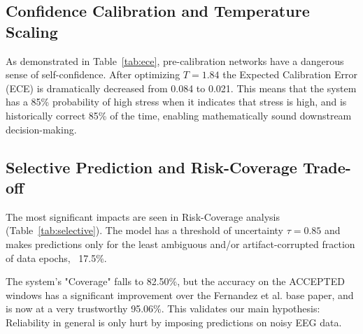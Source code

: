 \documentclass[conference,a4paper]{IEEEtran}
\begin{document}
\subsection{Confidence Calibration and Temperature Scaling}
As demonstrated in Table~\ref{tab:ece}, pre-calibration networks have a dangerous sense of self-confidence. After optimizing $T = 1.84$ the Expected Calibration Error (ECE) is dramatically decreased from 0.084 to 0.021. This means that the system has a 85\% probability of high stress when it indicates that stress is high, and is historically correct 85\% of the time, enabling mathematically sound downstream decision-making.

\begin{table}[htbp]
\renewcommand{\arraystretch}{1.4}
\caption{Calibration Metrics Pre- and Post-Temperature Scaling}
\label{tab:ece}
\begin{center}
\end{center}
\end{table}

\subsection{Selective Prediction and Risk-Coverage Trade-off}
The most significant impacts are seen in Risk-Coverage analysis (Table~\ref{tab:selective}). The model has a threshold of uncertainty $\tau = 0.85$ and makes predictions only for the least ambiguous and/or artifact-corrupted fraction of data epochs, ~17.5\%.

The system's "Coverage" falls to 82.50\%, but the accuracy on the ACCEPTED windows has a significant improvement over the Fernandez et al. base paper, and is now at a very trustworthy 95.06\%. This validates our main hypothesis: Reliability in general is only hurt by imposing predictions on noisy EEG data.
\end{document}
